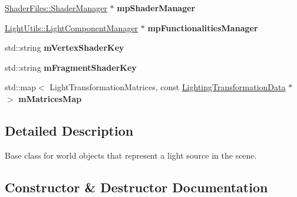 \begin{DoxyCompactItemize}
\mbox{\hyperlink{class_shader_files_1_1_shader_manager}{Shader\+Files\+::\+Shader\+Manager}} $\ast$ {\bfseries mp\+Shader\+Manager}
\item 
\mbox{\label{class_geometry_engine_1_1_geometry_world_item_1_1_geometry_light_1_1_light_a11dbfb35ac28df7fc30927acd5c847a1}} 
\mbox{\hyperlink{class_geometry_engine_1_1_light_utils_1_1_light_component_manager}{Light\+Utils\+::\+Light\+Component\+Manager}} $\ast$ {\bfseries mp\+Functionalities\+Manager}
\item 
\mbox{\label{class_geometry_engine_1_1_geometry_world_item_1_1_geometry_light_1_1_light_a0ccc9ec1473e73f9fa99ee82f9dd3fde}} 
std\+::string {\bfseries m\+Vertex\+Shader\+Key}
\item 
\mbox{\label{class_geometry_engine_1_1_geometry_world_item_1_1_geometry_light_1_1_light_a89bb65d39f7d64db038f04a543ea3cf5}} 
std\+::string {\bfseries m\+Fragment\+Shader\+Key}
\item 
\mbox{\label{class_geometry_engine_1_1_geometry_world_item_1_1_geometry_light_1_1_light_a63aa6d03f63a99cf8cd75673f7a947e8}} 
std\+::map$<$ Light\+Transformation\+Matrices, const \mbox{\hyperlink{class_geometry_engine_1_1_lighting_transformation_data}{Lighting\+Transformation\+Data}} $\ast$ $>$ {\bfseries m\+Matrices\+Map}
\end{DoxyCompactItemize}


\subsection{Detailed Description}
Base class for world objects that represent a light source in the scene. 

\subsection{Constructor \& Destructor Documentation}
\mbox{\label{class_geometry_engine_1_1_geometry_world_item_1_1_geometry_light_1_1_light_ad21bcb5a229e8bb799d2bba5462a2604}} 
